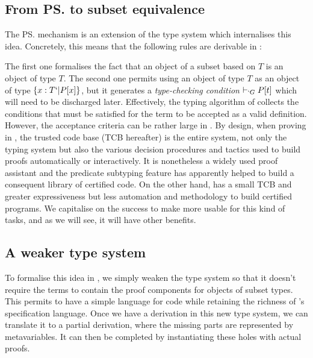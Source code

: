 \documentclass{llncs}
\begin{document}
\subsection{From \ps{} to subset equivalence}
The \ps{} mechanism \cite{Shankar&Owre:WADT99} %
is an extension of the \PVS type system which internalises this idea.
Concretely, this means that the following rules are derivable in \PVS:
\begin{center}
  \DP
  \DP
\end{center}

The first one formalises the fact that an object of a subset based on
$T$ is an object of type $T$. The second one permits using an object of
type $T$ as an object of type $\{ x : T `| P[x] \}$, but it generates a
\emph{type-checking condition} $\vdash_{`G} P[t]$ which will need to be
discharged later. Effectively, the typing algorithm of \PVS{} collects
the conditions that must be satisfied for the term to be accepted as a
valid definition. However, the acceptance criteria can be rather large in
\PVS{}. By design, when proving in \PVS{}, the trusted code base (TCB
hereafter) is the entire system, not only the typing system but also the
various decision procedures and tactics used to build proofs
automatically or interactively. It is nonetheless a widely used proof
assistant and the predicate subtyping feature has apparently helped to
build a consequent library of certified code. On the other hand, \Coq
has a small TCB and greater expressiveness but less automation and
methodology to build certified programs. We capitalise on the \PVS
success to make \Coq more usable for this kind of tasks, and as we will see,
it will have other benefits.

\subsection{A weaker type system}
To formalise this idea in \Coq, we simply weaken the type system so that
it doesn't require the terms to contain the proof components for objects
of subset types. This permits to have a simple language for code while
retaining the richness of \Coq's specification language. Once we have a
derivation in this new type system, we can translate it to a partial
\Coq derivation, where the missing parts are represented by
metavariables. It can then be completed by instantiating these holes
with actual proofs.
\end{document}
